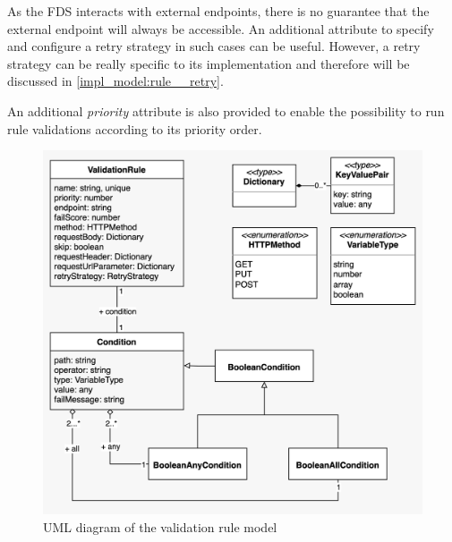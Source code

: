     As the FDS interacts with external endpoints, there is no guarantee that the external endpoint will always be accessible. An additional attribute to specify and configure a retry strategy in such cases can be useful. However, a retry strategy can be really specific to its implementation and therefore will be discussed in \autoref{impl_model:rule__retry}.

    An additional \emph{priority} attribute is also provided to enable the possibility to run rule validations according to its priority order.

    \begin{figure}[!ht]
      \includegraphics[width=\textwidth]{diagrams/entity_validation_rule.jpeg}
      \caption{UML diagram of the validation rule model}
      \label{fig:uml_validation_rule}
    \end{figure}
    

